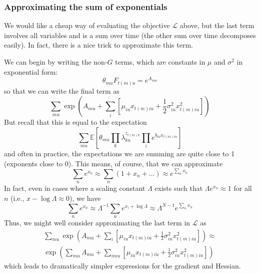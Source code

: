 \documentclass[11pt]{article}
\begin{document}
\subsubsection{Approximating the sum of exponentials}
We would like a cheap way of evaluating the objective $\mathcal{L}$ above, but the last term involves all variables and is a sum over time (the other sum over time decomposes easily). In fact, there is a nice trick to approximate this term. 

We can begin by writing the non-$G$ terms, which are constants in $\mu$ and $\sigma^2$ in exponential form:
\begin{equation}
    \theta_{mu} F_{t(m)u} = e^{A_{mu}}
\end{equation}
so that we can write the final term as
\begin{equation}
    \sum_{mu} \exp\left(A_{mu} +  \sum_i \left[ \mu_{iu} x_{t(m)iu} + 
    \frac{1}{2} \sigma^2_{iu} x^2_{t(m)iu}\right]\right)
\end{equation}
But recall that this is equal to the expectation
\begin{equation}
    \sum_{mu}\mathbb{E}\left[ \theta_{mu} \prod_k \lambda_{ku}^{z_{t(m)k}} 
    \prod_i e^{b_{iu} x_{t(m)iu}}\right]
\end{equation}
and often in practice, the expectations we are summing are quite close to 1 (exponents close to 0). This means, of course, that we can approximate 
\begin{equation}
    \sum_n e^{x_n} \approx \sum_n (1 + x_n + \ldots) \approx e^{\sum_n x_n}
\end{equation}
In fact, even in cases where a scaling constant $\Lambda$ exists such that $\Lambda e^{x_n} \approx 1$ for all $n$ (i.e., $x - \log \Lambda \approx 0$), we have
\begin{equation}
    \sum_n e^{x_n} \approx \Lambda^{-1} \sum_n e^{x_i + \log \Lambda} \approx
    \Lambda^{N - 1} e^{\sum_n x_n}
\end{equation}
Thus, we might well consider approximating the last term in $\mathcal{L}$ as
\begin{multline}
    \sum_{mu} \exp\left(A_{mu} +  \sum_i \left[ \mu_{iu} x_{t(m)iu} + 
    \frac{1}{2} \sigma^2_{iu} x^2_{t(m)iu}\right]\right) \approx \\
    \exp\left(\sum_{mu} A_{mu} +  \sum_{imu} \left[ \mu_{iu} x_{t(m)iu} + 
    \frac{1}{2} \sigma^2_{iu} x^2_{t(m)iu}\right]\right)
\end{multline}
which leads to dramatically simpler expressions for the gradient and Hessian.
\end{document}
